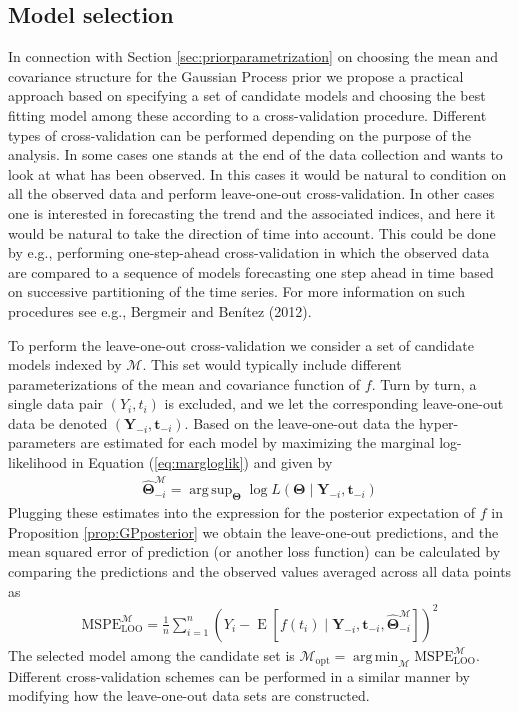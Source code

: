 \documentclass[
  11pt,
]{article}
\theoremstyle{nonumberplain}
\begin{document}
\hypertarget{sec:modelselection}{%
\subsection{Model selection}\label{sec:modelselection}}

In connection with Section \ref{sec:priorparametrization} on choosing
the mean and covariance structure for the Gaussian Process prior we
propose a practical approach based on specifying a set of candidate
models and choosing the best fitting model among these according to a
cross-validation procedure. Different types of cross-validation can be
performed depending on the purpose of the analysis. In some cases one
stands at the end of the data collection and wants to look at what has
been observed. In this cases it would be natural to condition on all the
observed data and perform leave-one-out cross-validation. In other cases
one is interested in forecasting the trend and the associated indices,
and here it would be natural to take the direction of time into account.
This could be done by e.g., performing one-step-ahead cross-validation
in which the observed data are compared to a sequence of models
forecasting one step ahead in time based on successive partitioning of
the time series. For more information on such procedures see e.g.,
Bergmeir and Benítez (2012).

To perform the leave-one-out cross-validation we consider a set of
candidate models indexed by \(\mathcal{M}\). This set would typically
include different parameterizations of the mean and covariance function
of \(f\). Turn by turn, a single data pair \((Y_i, t_i)\) is excluded,
and we let the corresponding leave-one-out data be denoted
\((\mathbf{Y}_{-i}, \mathbf{t}_{-i})\). Based on the leave-one-out data
the hyper-parameters are estimated for each model by maximizing the
marginal log-likelihood in Equation (\ref{eq:margloglik}) and given by
\begin{align*}
\widehat{\bm{\Theta}}_{-i}^\mathcal{M} = \mathop{\mathrm{arg\,sup}}_{\bm{\Theta}} \log L(\bm{\Theta} \mid \mathbf{Y}_{-i}, \mathbf{t}_{-i}) 
\end{align*} Plugging these estimates into the expression for the
posterior expectation of \(f\) in Proposition \ref{prop:GPposterior} we
obtain the leave-one-out predictions, and the mean squared error of
prediction (or another loss function) can be calculated by comparing the
predictions and the observed values averaged across all data points as
\begin{align*}
  \text{MSPE}_{\text{LOO}}^\mathcal{M} = \frac{1}{n}\sum_{i=1}^{n} \left(Y_i - \mathop{\mathrm{E}}[f(t_i) \mid \mathbf{Y}_{-i}, \mathbf{t}_{-i}, \widehat{\bm{\Theta}}_{-i}^\mathcal{M}]\right)^2
\end{align*} The selected model among the candidate set is
\(\mathcal{M}_{\text{opt}} = \mathop{\mathrm{arg\,min}}_\mathcal{M} \text{MSPE}_{\text{LOO}}^\mathcal{M}\).
Different cross-validation schemes can be performed in a similar manner
by modifying how the leave-one-out data sets are constructed.
\end{document}
